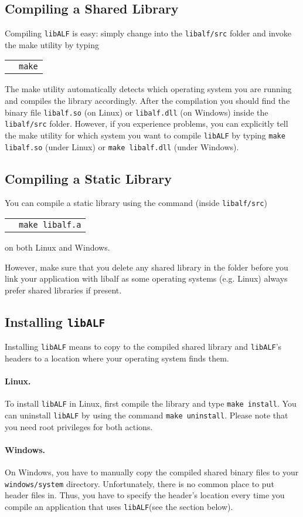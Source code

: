 \documentclass[a4paper, fontsize=11pt, DIV=12, parskip=half]{scrartcl}
\newcommand{\libalf}{\texttt{libALF}\xspace}
\newcommand{\cmd}[1]{
\begin{tabular}{p{.025\textwidth}l}
&\begin{minipage}{.85\textwidth}\texttt{#1}\end{minipage}
\end{tabular}
}
\begin{document}
\subsection*{Compiling a Shared Library}
Compiling \libalf is easy: simply change into the \texttt{libalf/src} folder and invoke the make utility by typing 

\cmd{make}

The make utility automatically detects which operating system you are running and compiles the library accordingly. After the compilation you should find the binary file \texttt{libalf.so} (on Linux) or \texttt{libalf.dll} (on Windows) inside the \texttt{libalf/src} folder. However, if you experience problems, you can explicitly tell the make utility for which system you want to compile \libalf by typing \texttt{make libalf.so} (under Linux) or \texttt{make libalf.dll} (under Windows).

\subsection*{Compiling a Static Library}
You can compile a static library using the command (inside \texttt{libalf/src})

\cmd{make libalf.a}

on both Linux and Windows.

However, make sure that you delete any shared library in the folder before you link your application with libalf as some operating systems (e.g. Linux) always prefer shared libraries if present.

\subsection{Installing \libalf}
Installing \libalf means to copy to the compiled shared library and \libalf's headers to a location where your operating system finds them.

\paragraph{Linux.}
To install \libalf in Linux, first compile the library and type \texttt{make install}. You can uninstall \libalf by using the command \texttt{make uninstall}. Please note that you need root privileges for both actions.

\paragraph{Windows.}
On Windows, you have to manually copy the compiled shared binary files to your \texttt{windows/system} directory. Unfortunately, there is no common place to put header files in. Thus, you have to specify the header's location every time you compile an application that uses \libalf (see the section below).
\end{document}
